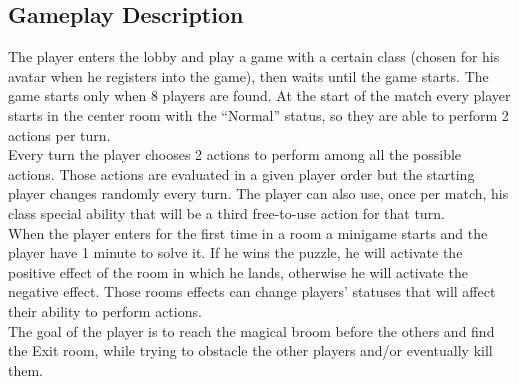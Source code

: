\subsection{Gameplay Description}
The player enters the lobby and play a game with a certain class (chosen for his avatar when he registers into the game), then waits until the game starts. The game starts only when 8 players are found. At the start of the match every player starts in the center room with the “Normal” status, so they are able to perform 2 actions per turn.\\
Every turn the player chooses 2 actions to perform among all the possible actions. Those actions are evaluated in a given player order but the starting player changes randomly every turn. The player can also use, once per match, his class special ability that will be a third free-to-use action for that turn.\\
When the player enters for the first time in a room a minigame starts and the player have 1 minute to solve it. If he wins the puzzle, he will activate the positive effect of the room in which he lands, otherwise he will activate the negative effect. Those rooms effects can change players’ statuses that will affect their ability to perform actions. \\
The goal of the player is to reach the magical broom before the others and find the Exit room, while trying to obstacle the other players and/or eventually kill them.\\